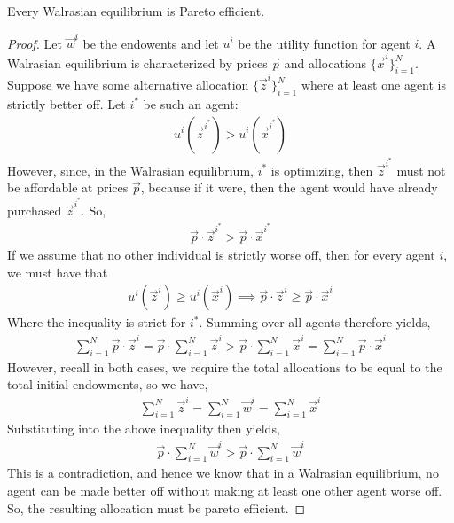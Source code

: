 \begin{theorem*}
    Every Walrasian equilibrium is Pareto efficient. 
\end{theorem*}
\begin{proof}
    Let $\vec{w}^i$ be the endowents and let $u^i$ be the utility function for agent $i$. A Walrasian equilibrium is characterized by prices $\vec{p}$ and allocations $\{\vec{x}^i\}_{i = 1}^N$. Suppose we have some alternative allocation $\{\vec{z}^i\}_{i = 1}^N$ where at least one agent is strictly better off. Let $i^*$ be such an agent: 
    \begin{align*}
        u^i(\vec{z}^{i^*}) > u^i(\vec{x}^{i^*})
    \end{align*}
    However, since, in the Walrasian equilibrium, $i^*$ is optimizing, then $\vec{z}^{i^*}$ must not be affordable at prices $\vec{p}$, because if it were, then the agent would have already purchased $\vec{z}^{i^*}$. So,
    \begin{align*}
        \vec{p} \cdot \vec{z}^{i^*} > \vec{p} \cdot \vec{x}^{i^*}
    \end{align*}
    If we assume that no other individual is strictly worse off, then for every agent $i$, we must have that
    \begin{align*}
        u^i(\vec{z}^i) \geq u^i(\vec{x}^i) \implies \vec{p} \cdot \vec{z}^i \geq \vec{p} \cdot \vec{x}^i
    \end{align*}
    Where the inequality is strict for $i^*$. Summing over all agents therefore yields,
    \begin{align*}
        \sum_{i = 1}^N \vec{p} \cdot \vec{z}^i = \vec{p} \cdot \sum_{i = 1}^N \vec{z}^i > \vec{p} \cdot \sum_{i = 1}^N \vec{x}^i = \sum_{i = 1}^N \vec{p} \cdot \vec{x}^i
    \end{align*}
    However, recall in both cases, we require the total allocations to be equal to the total initial endowments, so we have,
    \begin{align*}
        \sum_{i = 1}^N \vec{z}^i = \sum_{i = 1}^N \vec{w}^i = \sum_{i = 1}^N \vec{x}^i
    \end{align*}
    Substituting into the above inequality then yields,
    \begin{align*}
        \vec{p} \cdot \sum_{i = 1}^N \vec{w}^i > \vec{p} \cdot \sum_{i = 1}^N \vec{w}^i
    \end{align*}
    This is a contradiction, and hence we know that in a Walrasian equilibrium, no agent can be made better off without making at least one other agent worse off. So, the resulting allocation must be pareto efficient. 
\end{proof}

